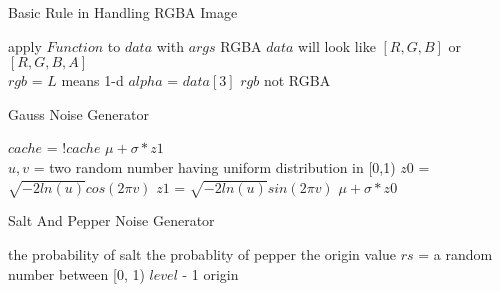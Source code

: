 \documentclass{article}
\begin{document}
  \begin{algorithm}
    \caption{Basic Rule in Handling RGBA Image}
    \label{RGB}
    \begin{algorithmic}[1]
      \LineComment apply $Function$ to $data$ with $args$
       \Comment RGBA
      \LineComment $data$ will look like $[R,G,B]$ or $[R,G,B,A]$ 
      \\ 
      \State $rgb$ =  \Comment $L$ means 1-d
        \State $alpha$ = $data[3]$
        \State \Return {}
        \Else
        \State \Return $rgb$
        \EndIf
      \EndIf
      \State \Return {} \Comment not RGBA
      \EndFunction
    \end{algorithmic}
  \end{algorithm}

  \newpage

  \begin{algorithm}
    \caption{Gauss Noise Generator}
    \label{GaussGenerator}
    \begin{algorithmic}[1]
      \State $cache$ = $!cache$ 
      \State \Return $\mu + \sigma * z1$ 
      \EndIf
      \\
      \State $u, v$ = two random number having uniform distribution in [0,1)
      \State $z0$ = $\sqrt{-2ln(u)}cos(2\pi v)$
      \State $z1$ = $\sqrt{-2ln(u)}sin(2\pi v)$
      \State \Return $\mu + \sigma * z0$
      \EndFunction
    \end{algorithmic}
  \end{algorithm}

  \begin{algorithm}
    \caption{Salt And Pepper Noise Generator}
    \label{SaltPepperGenerator}
    \begin{algorithmic}[1]
       the probability of salt
       the probablity of pepper
       the origin value
      \State $rs$ = a random number between [0, 1)
      \State \Return $level$ - 1
      \State {}
      \Else
      \State \Return origin
      \EndIf
      \EndFunction
    \end{algorithmic}
  \end{algorithm}
\end{document}
